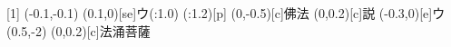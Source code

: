 \documentclass[m_shidai]{subfiles}
\begin{document}
{[1]{\lw}\aki{\q}\qyu{}}
{\qyu\moveTo(-0.1,-0.1)\iro{\c}\sho{}%
\iro{\c}\sho\tsuya{\q}}
{\lwoo{}\tsuya{\q}%
\aki{}\ooyu{\q}\kili[e]\moji(0.1,0)[se]{ウ}\base(\s:1.0)%
\modori*(\w:1.2)[p]\orisute\iro{\k}\sho\iro[2]{\k}\sho}
\karifu(0,-0.5)[c]{佛法}
{\sho\tsuya{\q}\tsu{}\aki\tsuya{\q}}
\newline
\karifu(0,0.2)[c]{説}{\qyu}
\newline
\newline
{}
{\chikara{\lw}\aki{\q}\aki{\q}\qyu\矢[e]}%
{\aki\tsuyamochi{\q}\moji(-0.3,0)[e]{ウ}\sho%
\moveTo(0.5,-2)\iro{\c}\sho\tsuya{\q}}%
\karifu(0,0.2)[c]{法涌菩薩}%
{\qyu\矢[e]\aki\qyu\長[e]%
\kak{}%
\kak\矢[s]\tsu}%
\end{document}
